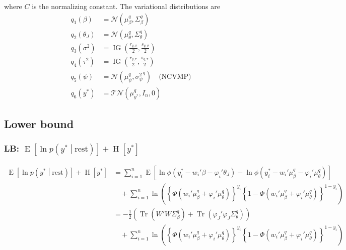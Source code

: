 \documentclass[11pt]{article}
\DeclareMathOperator{\Tr}{Tr}
\newcommand{\opn}{\operatorname}
\begin{document}
where $C$ is the normalizing constant. The variational distributions are
\begin{align*}
  q_{1}\left(\beta\right) &= \mathcal{N}\left(\mu_{\beta}^{q}, \Sigma_{\beta}^{q}\right)\\
  q_{2}\left(\theta_{J}\right) &= \mathcal{N}\left(\mu_{\theta}^{q},\Sigma_{\theta}^{q}\right)\\
  q_{3}\left(\sigma^{2}\right) &= \opn{IG}\left(\frac{r_{q,\sigma}}{2},\frac{s_{q,\sigma}}{2}\right)\\
  q_{4}\left(\tau^{2}\right) &= \opn{IG}\left(\frac{r_{q,\tau}}{2},\frac{s_{q,\tau}}{2}\right)\\
  q_{5}\left(\psi\right) &= \mathcal{N}\left(\mu_{\psi}^{q}, {\sigma_{\psi}^{2}}^{q}\right) \quad \text{(NCVMP)}\\
  q_{6}\left(y^{*}\right) &= \mathcal{TN}\left(\mu_{y^{*}}^{q}, I_{n},0\right)
\end{align*}
\subsection{Lower bound}
\subsubsection{LB: $\opn{E}\left[\ln p\left(y^{*}\middle|\text{rest}\right)\right]+\opn{H}\left[y^{*}\right]$}
\begin{align*}
  \opn{E}\left[\ln p\left(y^{*}\middle|\text{rest}\right)\right]+\opn{H}\left[y^{*}\right] &= \sum_{i=1}^{n}\opn{E}\left[\ln \phi\left(y_{i}^{*}-w_{i}'\beta-\varphi_{i}'\theta_{J}\right)-\ln \phi\left(y_{i}^{*}-w_{i}'\mu_{\beta}^{q}-\varphi_{i}'\mu_{\theta}^{q}\right) \right]\\
  &\quad +\sum_{i=1}^{n}\ln\left(\left\{\Phi\left(w_{i}'\mu_{\beta}^{q}+\varphi_{i}'\mu_{\theta}^{q}\right) \right\}^{y_{i}}\left\{1-\Phi\left(w_{i}'\mu_{\beta}^{q}+\varphi_{i}'\mu_{\theta}^{q}\right) \right\}^{1-y_{i}} \right)\\
  &= -\frac{1}{2}\left(\Tr\left(W'W\Sigma_{\beta}^{q}\right)+\Tr\left(\varphi_{J}'\varphi_{J}\Sigma_{\theta}^{q}\right)\right)\\
  &\quad +\sum_{i=1}^{n}\ln\left(\left\{\Phi\left(w_{i}'\mu_{\beta}^{q}+\varphi_{i}'\mu_{\theta}^{q}\right) \right\}^{y_{i}}\left\{1-\Phi\left(w_{i}'\mu_{\beta}^{q}+\varphi_{i}'\mu_{\theta}^{q}\right) \right\}^{1-y_{i}} \right)
\end{align*}
\end{document}
